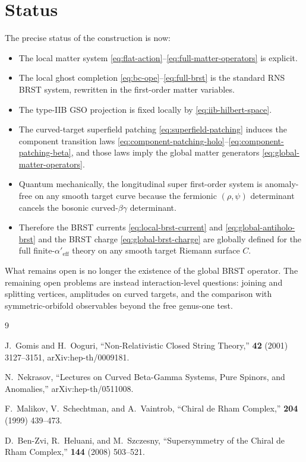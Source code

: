 \documentclass[11pt]{article}
\newcommand{\Aeff}{\alpha'_{\mathrm{eff}}}
\begin{document}
\section{Status}
The precise status of the construction is now:
\begin{itemize}
\item The local matter system \eqref{eq:flat-action}--\eqref{eq:full-matter-operators} is explicit.
\item The local ghost completion \eqref{eq:bc-ope}--\eqref{eq:full-brst} is the standard RNS BRST system, rewritten in the first-order matter variables.
\item The type-IIB GSO projection is fixed locally by \eqref{eq:iib-hilbert-space}.
\item The curved-target superfield patching \eqref{eq:superfield-patching} induces the component transition laws \eqref{eq:component-patching-holo}--\eqref{eq:component-patching-beta}, and those laws imply the global matter generators \eqref{eq:global-matter-operators}.
\item Quantum mechanically, the longitudinal super first-order system is anomaly-free on any smooth target curve because the fermionic $(\rho,\psi)$ determinant cancels the bosonic curved-$\beta\gamma$ determinant.
\item Therefore the BRST currents \eqref{eq:local-brst-current} and \eqref{eq:global-antiholo-brst} and the BRST charge \eqref{eq:global-brst-charge} are globally defined for the full finite-$\Aeff$ theory on any smooth target Riemann surface $C$.
\end{itemize}
What remains open is no longer the existence of the global BRST operator. The remaining open problems are instead interaction-level questions: joining and splitting vertices, amplitudes on curved targets, and the comparison with symmetric-orbifold observables beyond the free genus-one test.

\begin{thebibliography}{9}

J.~Gomis and H.~Ooguri,
\newblock ``Non-Relativistic Closed String Theory,''
 {\bf 42} (2001) 3127--3151,
\newblock arXiv:hep-th/0009181.

N.~Nekrasov,
\newblock ``Lectures on Curved Beta-Gamma Systems, Pure Spinors, and Anomalies,''
\newblock arXiv:hep-th/0511008.

F.~Malikov, V.~Schechtman, and A.~Vaintrob,
\newblock ``Chiral de Rham Complex,''
 {\bf 204} (1999) 439--473.

D.~Ben-Zvi, R.~Heluani, and M.~Szczesny,
\newblock ``Supersymmetry of the Chiral de Rham Complex,''
 {\bf 144} (2008) 503--521.

\end{thebibliography}
\end{document}
